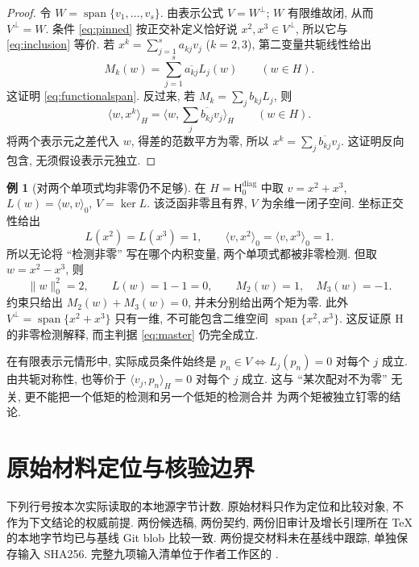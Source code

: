 \documentclass[UTF8,11pt]{ctexart}
\theoremstyle{definition}
\newtheorem{example}[theorem]{例}
\DeclareMathOperator{\Span}{span}
\newcommand{\ip}[2]{\langle #1,#2\rangle_H}
\newcommand{\Hd}[1]{\mathsf H_{#1}^{\mathrm{diag}}}
\begin{document}
\begin{proof}
令 $W=\Span\{v_1,\ldots,v_s\}$.
由表示公式 $V=W^\perp$; $W$ 有限维故闭, 从而 $V^\perp=W$.
条件 \eqref{eq:pinned} 按正交补定义恰好说 $x^2,x^3\in V^\perp$,
所以它与 \eqref{eq:inclusion} 等价.
若 $x^k=\sum_{j=1}^s a_{kj}v_j$ ($k=2,3$), 第二变量共轭线性给出
\begin{equation}\label{eq:conjugates}
 M_k(w)=\sum_{j=1}^s\overline{a_{kj}}L_j(w)\qquad(w\in H).
\end{equation}
这证明 \eqref{eq:functionalspan}.
反过来, 若 $M_k=\sum_j b_{kj}L_j$, 则
\[
 \ip{w}{x^k}=\ip{w}{\sum_j\overline{b_{kj}}v_j}\qquad(w\in H).
\]
将两个表示元之差代入 $w$, 得差的范数平方为零,
所以 $x^k=\sum_j\overline{b_{kj}}v_j$.
这证明反向包含, 无须假设表示元独立.
\end{proof}

\begin{example}[对两个单项式均非零仍不足够]\label{ex:representer}
在 $H=\Hd0$ 中取 $v=x^2+x^3$, $L(w)=\langle w,v\rangle_0$, $V=\ker L$.
该泛函非零且有界, $V$ 为余维一闭子空间.
坐标正交性给出
\[
 L(x^2)=L(x^3)=1,\qquad
 \langle v,x^2\rangle_0=\langle v,x^3\rangle_0=1.
\]
所以无论将 ``检测非零'' 写在哪个内积变量, 两个单项式都被非零检测.
但取 $w=x^2-x^3$, 则
\[
 \|w\|_0^2=2,\qquad L(w)=1-1=0,\qquad
 M_2(w)=1,\quad M_3(w)=-1.
\]
约束只给出 $M_2(w)+M_3(w)=0$, 并未分别给出两个矩为零.
此外 $V^\perp=\Span\{x^2+x^3\}$ 只有一维,
不可能包含二维空间 $\Span\{x^2,x^3\}$.
这反证原 H 的非零检测解释, 而主判据 \eqref{eq:master} 仍完全成立.
\end{example}

在有限表示元情形中, 实际成员条件始终是
$p_n\in V\Longleftrightarrow L_j(p_n)=0$ 对每个 $j$ 成立.
由共轭对称性, 也等价于 $\ip{v_j}{p_n}=0$ 对每个 $j$ 成立.
这与 ``某次配对不为零'' 无关, 更不能把一个低矩的检测和另一个低矩的检测合并
为两个矩被独立钉零的结论.

\section{原始材料定位与核验边界}\label{sec:sources}

下列行号按本次实际读取的本地源字节计数. 原始材料只作为定位和比较对象,
不作为下文结论的权威前提. 两份候选稿, 两份契约, 两份旧审计及增长引理所在
TeX 的本地字节均已与基线 Git blob 比较一致.
两份提交材料未在基线中跟踪, 单独保存输入 SHA256.
完整九项输入清单位于作者工作区的 .
\end{document}
